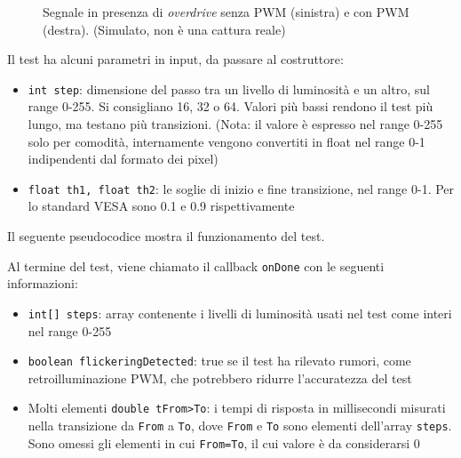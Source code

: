 \begin{figure}[H]
	\centering
	\caption{Segnale in presenza di \textit{overdrive} senza PWM (sinistra) e con PWM (destra). (Simulato, non è una cattura reale)}
	\label{fig:pixelResponseTime_example2}
\end{figure}

Il test ha alcuni parametri in input, da passare al costruttore:\begin{itemize}
	\item \texttt{int step}: dimensione del passo tra un livello di luminosità e un altro, sul range 0-255. Si consigliano 16, 32 o 64. Valori più bassi rendono il test più lungo, ma testano più transizioni. (Nota: il valore è espresso nel range 0-255 solo per comodità, internamente vengono convertiti in float nel range 0-1 indipendenti dal formato dei pixel)
	\item \texttt{float th1, float th2}: le soglie di inizio e fine transizione, nel range 0-1. Per lo standard VESA sono 0.1 e 0.9 rispettivamente
\end{itemize}

Il seguente pseudocodice mostra il funzionamento del test.


Al termine del test, viene chiamato il callback \texttt{onDone} con le seguenti informazioni:\begin{itemize}
	\item \texttt{int[] steps}: array contenente i livelli di luminosità usati nel test come interi nel range 0-255
	\item \texttt{boolean flickeringDetected}: true se il test ha rilevato rumori, come retroilluminazione PWM, che potrebbero ridurre l'accuratezza del test
	\item Molti elementi \texttt{double tFrom>To}: i tempi di risposta in millisecondi misurati nella transizione da \texttt{From} a \texttt{To}, dove \texttt{From} e \texttt{To} sono elementi dell'array \texttt{steps}. Sono omessi gli elementi in cui \texttt{From=To}, il cui valore è da considerarsi 0
\end{itemize}

